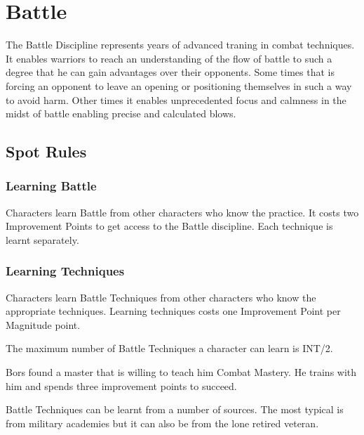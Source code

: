\chapter{Battle}
\label{ch:battle}

The Battle Discipline represents years of advanced traning in combat techniques. It enables warriors to reach an understanding of the flow of battle to such a degree that he can gain advantages over their opponents. Some times that is forcing an opponent to leave an opening or positioning themselves in such a way to avoid harm. Other times it enables unprecedented focus and calmness in the midst of battle enabling precise and calculated blows.


\section{Spot Rules}

\subsection{Learning Battle}
Characters learn Battle from other characters who know the practice. It costs two Improvement Points to get access to the Battle discipline. Each technique is learnt separately.

\subsection{Learning Techniques}
Characters learn Battle Techniques from other characters who know the appropriate techniques. Learning techniques costs one Improvement Point per Magnitude point. 

The maximum number of Battle Techniques a character can learn is INT/2.

\begin{rpg-examplebox}
Bors found a master that is willing to teach him Combat Mastery. He trains with him and spends three improvement points to succeed. 
\end{rpg-examplebox}

Battle Techniques can be learnt from a number of sources. The most typical is from military academies but it can also be from the lone retired veteran. 


